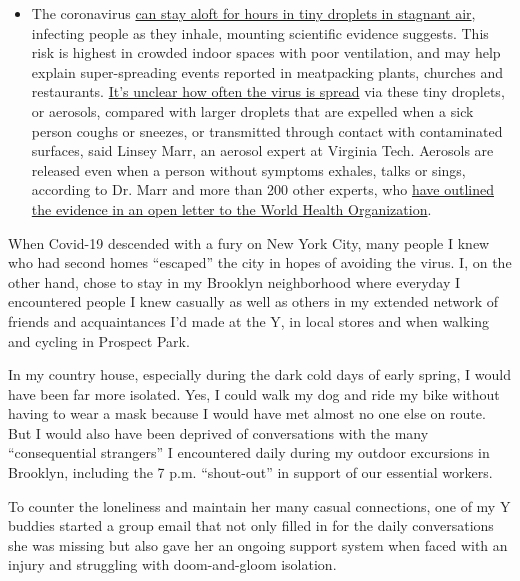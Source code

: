 \begin{itemize}
  \begin{itemize}
  \tightlist
  \item
    The coronavirus
    \href{https://www.nytimes.com/2020/07/04/health/239-experts-with-one-big-claim-the-coronavirus-is-airborne.html?action=click\&pgtype=Article\&state=default\&region=MAIN_CONTENT_3\&context=storylines_faq}{can
    stay aloft for hours in tiny droplets in stagnant air}, infecting
    people as they inhale, mounting scientific evidence suggests. This
    risk is highest in crowded indoor spaces with poor ventilation, and
    may help explain super-spreading events reported in meatpacking
    plants, churches and restaurants.
    \href{https://www.nytimes.com/2020/07/06/health/coronavirus-airborne-aerosols.html?action=click\&pgtype=Article\&state=default\&region=MAIN_CONTENT_3\&context=storylines_faq}{It's
    unclear how often the virus is spread} via these tiny droplets, or
    aerosols, compared with larger droplets that are expelled when a
    sick person coughs or sneezes, or transmitted through contact with
    contaminated surfaces, said Linsey Marr, an aerosol expert at
    Virginia Tech. Aerosols are released even when a person without
    symptoms exhales, talks or sings, according to Dr. Marr and more
    than 200 other experts, who
    \href{https://academic.oup.com/cid/article/doi/10.1093/cid/ciaa939/5867798}{have
    outlined the evidence in an open letter to the World Health
    Organization}.
  \end{itemize}
\end{itemize}

When Covid-19 descended with a fury on New York City, many people I knew
who had second homes ``escaped'' the city in hopes of avoiding the
virus. I, on the other hand, chose to stay in my Brooklyn neighborhood
where everyday I encountered people I knew casually as well as others in
my extended network of friends and acquaintances I'd made at the Y, in
local stores and when walking and cycling in Prospect Park.

In my country house, especially during the dark cold days of early
spring, I would have been far more isolated. Yes, I could walk my dog
and ride my bike without having to wear a mask because I would have met
almost no one else on route. But I would also have been deprived of
conversations with the many ``consequential strangers'' I encountered
daily during my outdoor excursions in Brooklyn, including the 7 p.m.
``shout-out'' in support of our essential workers.

To counter the loneliness and maintain her many casual connections, one
of my Y buddies started a group email that not only filled in for the
daily conversations she was missing but also gave her an ongoing support
system when faced with an injury and struggling with doom-and-gloom
isolation.

